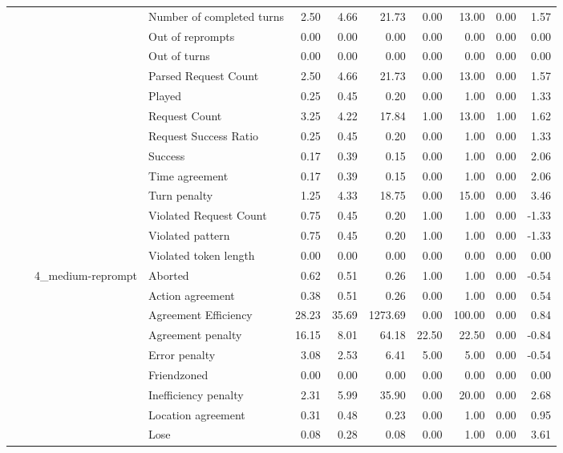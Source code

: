 \begin{tabular}{llllrrrrrrr}
 &  &  & Number of completed turns & 2.50 & 4.66 & 21.73 & 0.00 & 13.00 & 0.00 & 1.57 \\
 &  &  & Out of reprompts & 0.00 & 0.00 & 0.00 & 0.00 & 0.00 & 0.00 & 0.00 \\
 &  &  & Out of turns & 0.00 & 0.00 & 0.00 & 0.00 & 0.00 & 0.00 & 0.00 \\
 &  &  & Parsed Request Count & 2.50 & 4.66 & 21.73 & 0.00 & 13.00 & 0.00 & 1.57 \\
 &  &  & Played & 0.25 & 0.45 & 0.20 & 0.00 & 1.00 & 0.00 & 1.33 \\
 &  &  & Request Count & 3.25 & 4.22 & 17.84 & 1.00 & 13.00 & 1.00 & 1.62 \\
 &  &  & Request Success Ratio & 0.25 & 0.45 & 0.20 & 0.00 & 1.00 & 0.00 & 1.33 \\
 &  &  & Success & 0.17 & 0.39 & 0.15 & 0.00 & 1.00 & 0.00 & 2.06 \\
 &  &  & Time agreement & 0.17 & 0.39 & 0.15 & 0.00 & 1.00 & 0.00 & 2.06 \\
 &  &  & Turn penalty & 1.25 & 4.33 & 18.75 & 0.00 & 15.00 & 0.00 & 3.46 \\
 &  &  & Violated Request Count & 0.75 & 0.45 & 0.20 & 1.00 & 1.00 & 0.00 & -1.33 \\
 &  &  & Violated pattern & 0.75 & 0.45 & 0.20 & 1.00 & 1.00 & 0.00 & -1.33 \\
 &  &  & Violated token length & 0.00 & 0.00 & 0.00 & 0.00 & 0.00 & 0.00 & 0.00 \\
\cline{3-11}
 &  & \multirow[t]{27}{*}{4_medium-reprompt} & Aborted & 0.62 & 0.51 & 0.26 & 1.00 & 1.00 & 0.00 & -0.54 \\
 &  &  & Action agreement & 0.38 & 0.51 & 0.26 & 0.00 & 1.00 & 0.00 & 0.54 \\
 &  &  & Agreement Efficiency & 28.23 & 35.69 & 1273.69 & 0.00 & 100.00 & 0.00 & 0.84 \\
 &  &  & Agreement penalty & 16.15 & 8.01 & 64.18 & 22.50 & 22.50 & 0.00 & -0.84 \\
 &  &  & Error penalty & 3.08 & 2.53 & 6.41 & 5.00 & 5.00 & 0.00 & -0.54 \\
 &  &  & Friendzoned & 0.00 & 0.00 & 0.00 & 0.00 & 0.00 & 0.00 & 0.00 \\
 &  &  & Inefficiency penalty & 2.31 & 5.99 & 35.90 & 0.00 & 20.00 & 0.00 & 2.68 \\
 &  &  & Location agreement & 0.31 & 0.48 & 0.23 & 0.00 & 1.00 & 0.00 & 0.95 \\
 &  &  & Lose & 0.08 & 0.28 & 0.08 & 0.00 & 1.00 & 0.00 & 3.61 \\

\end{tabular}
